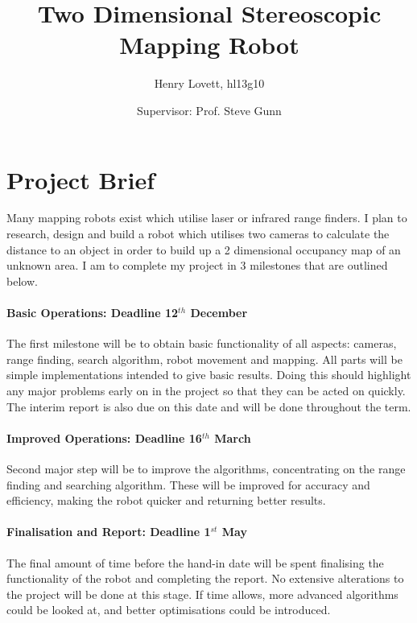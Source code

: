\documentclass[12pt]{article}
\title{Two Dimensional Stereoscopic Mapping Robot}
\author{Henry Lovett,
hl13g10}
\date{Supervisor: Prof. Steve Gunn}
\begin{document}
\maketitle

\section{Project Brief}

Many mapping robots exist which utilise laser or infrared range finders. I plan to research, design and build a robot which utilises two cameras to calculate the distance to an object in order to build up a 2 dimensional occupancy map of an unknown area. I am to complete my project in 3 milestones that are outlined below.

\paragraph{Basic Operations: Deadline 12$^{th}$ December}
The first milestone will be to obtain basic functionality of all aspects: cameras, range finding, search algorithm, robot movement and mapping. All parts will be simple implementations intended to give basic results. Doing this should highlight any major problems early on in the project so that they can be acted on quickly. The interim report is also due on this date and will be done throughout the term. 

\paragraph{Improved Operations: Deadline 16$^{th}$ March}
Second major step will be to improve the algorithms, concentrating on the range finding and searching algorithm. These will be improved for accuracy and efficiency, making the robot quicker and returning better results. 

\paragraph{Finalisation and Report: Deadline 1$^{st}$ May}
The final amount of time before the hand-in date will be spent finalising the functionality of the robot and completing the report. No extensive alterations to the project will be done at this stage. If time allows, more advanced algorithms could be looked at, and better optimisations could be introduced. 
\end{document}
